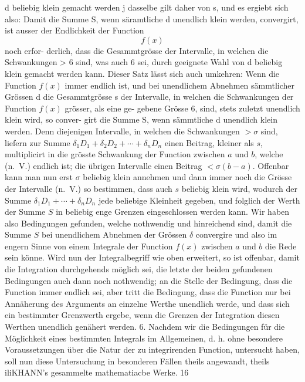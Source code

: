 \documentclass[12pt,a4paper]{book}
\theoremstyle{definition}
\theoremstyle{remark}
\begin{document}
{{%
d  beliebig  klein  gemacht   werden j  dasselbe  gilt  daher  von  s,  und  es
ergiebt  sich  also:
Damit  die  Summe  S,  wenn  säramtliche  d  unendlich  klein  werden,
convergirt,  ist  ausser  der  Endlichkeit  der  Function  $$f(x)$$  noch  erfor-
derlich, dass  die  Gesammtgrösse  der  Intervalle,  in  welchen  die
Schwankungen  >  6  sind,  was  auch  6  sei,  durch  geeignete  Wahl  von
d  beliebig  klein  gemacht  werden  kann.
Dieser  Satz  lässt  sich  auch  umkehren:
Wenn  die  Function  $f(x)$  immer  endlich  ist,  und  bei  unendlichem
Abnehmen  sämmtlicher  Grössen  d  die  Gesammtgrösse  s  der  Intervalle,
in  welchen  die  Schwankungen  der  Function  $f(x)$  grösser,  als  eine  ge-
gebene Grösse  6,  sind,  stets  zuletzt  unendlich  klein  wird,  so  conver-
girt  die  Summe  S,  wenn  sämmtliche  d  unendlich  klein  werden.
Denn  diejenigen  Intervalle,  in  welchen  die  Schwankungen  $> \sigma$
sind,  liefern  zur  Summe  $\delta_1 D_1 + \delta_2 D_2 + \cdots + \delta_n D_n$  einen  Beitrag,
kleiner  als  $s$,  multiplicirt  in  die  grösste  Schwankung  der  Function
zwischen  $a$  und  $b$,  welche  (n.~V.)  endlich  ist;  die  übrigen  Intervalle
einen  Beitrag  $< \sigma(b-a)$.  Offenbar  kann  man  nun  erst  $\sigma$  beliebig
klein  annehmen  und  dann  immer  noch  die  Grösse  der  Intervalle  (n.~V.)
so  bestimmen,  dass  auch  $s$  beliebig  klein  wird,  wodurch  der  Summe
$\delta_1 D_1 + \cdots + \delta_n D_n$  jede  beliebige  Kleinheit  gegeben,  und  folglich
der  Werth  der  Summe  $S$  in  beliebig  enge  Grenzen  eingeschlossen
werden  kann.
Wir  haben  also  Bedingungen  gefunden,  welche  nothwendig  und
hinreichend  sind,  damit  die  Summe  $S$  bei  unendlichem  Abnehmen  der
Grössen  $\delta$  convergire  und  also  im  engern  Sinne  von  einem  Integrale
der  Function  $f(x)$  zwischen  $a$  und  $b$  die  Rede  sein  könne.
Wird  nun  der  Integralbegriff  wie  oben  erweitert,  so  ist  offenbar,
damit  die  Integration  durchgehends  möglich  sei,  die  letzte  der  beiden
gefundenen  Bedingungen  auch  dann  noch  nothwendig;  an  die  Stelle
der  Bedingung,  dass  die  Function  immer  endlich  sei,  aber  tritt  die
Bedingung,  dass  die  Function  nur  bei  Annäherung  des  Arguments  an
einzelne  Werthe  unendlich  werde,  und  dass  sich  ein  bestimmter
Grenzwerth  ergebe,  wenn  die  Grenzen  der  Integration  diesen  Werthen
unendlich  genähert  werden.
6.
Nachdem  wir  die  Bedingungen  für  die  Möglichkeit  eines  bestimmten
Integrals  im  Allgemeinen,  d.  h.  ohne  besondere  Voraussetzungen  über
die  Natur  der  zu  integrirenden  Function,  untersucht  haben,  soll  nun
diese    Untersuchung    in    besonderen    Fällen    theils    angewandt,    theils
iliKHANN's  gesammelte  mathematiacbe  Werke.  16
\newpage

}}
\end{document}
